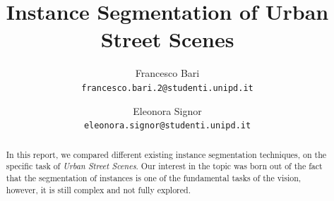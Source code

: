 \documentclass[10pt,twocolumn,letterpaper]{article}
\begin{document}
\title{Instance Segmentation of Urban Street Scenes}

\author{Francesco Bari\\
{\tt\small francesco.bari.2@studenti.unipd.it}
\and
Eleonora Signor\\
{\tt\small eleonora.signor@studenti.unipd.it}
}

\maketitle

\begin{abstract}
In this report, we compared different existing instance segmentation techniques, on the specific task of \textit{Urban Street Scenes}. Our interest in the topic was born out of the fact that the segmentation of instances is one of the fundamental tasks of the vision, however, it is still complex and not fully explored.
\end{abstract}

\end{document}
